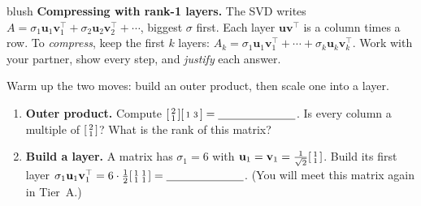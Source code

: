 \documentclass[10pt]{article}
\newcommand{\uu}{\mathbf{u}}
\newcommand{\vv}{\mathbf{v}}
\newcommand{\T}{^{\top}}
\begin{document}
\namepartnerperiod

\vspace{0.10in}

\begin{headlinebox}{blush}
\small\textbf{Compressing with rank-1 layers.} The SVD writes $A=\sigma_1\uu_1\vv_1\T+\sigma_2\uu_2\vv_2\T+\cdots$,
biggest $\sigma$ first. Each layer $\uu\vv\T$ is a column times a row. To \emph{compress}, keep the first
$k$ layers: $A_k=\sigma_1\uu_1\vv_1\T+\cdots+\sigma_k\uu_k\vv_k\T$. Work with your partner, show every step,
and \emph{justify} each answer.
\end{headlinebox}

\vspace{0.08in}

\begin{tcolorbox}[colback=white, colframe=black!40, title=\textbf{Tier R --- Remediate},
    fonttitle=\bfseries, arc=1.5mm, left=3mm, right=3mm, top=2mm, bottom=2mm, breakable]
Warm up the two moves: build an outer product, then scale one into a layer.
\begin{enumerate}[leftmargin=1.7em, itemsep=9pt]
  \item \textbf{Outer product.} Compute $\begin{bsmallmatrix} 2\\1 \end{bsmallmatrix}\begin{bsmallmatrix} 1 & 3 \end{bsmallmatrix}=\blank{2.4cm}$. Is every column a multiple of $\begin{bsmallmatrix} 2\\1 \end{bsmallmatrix}$? What is the rank of this matrix? \writeline
  \item \textbf{Build a layer.} A matrix has $\sigma_1=6$ with $\uu_1=\vv_1=\tfrac1{\sqrt2}\begin{bsmallmatrix} 1\\1 \end{bsmallmatrix}$. Build its first layer $\sigma_1\uu_1\vv_1\T=6\cdot\tfrac12\begin{bsmallmatrix} 1 & 1\\ 1 & 1 \end{bsmallmatrix}=\blank{2.4cm}$. (You will meet this matrix again in Tier~A.) \writeline
\end{enumerate}
\end{tcolorbox}
\end{document}
